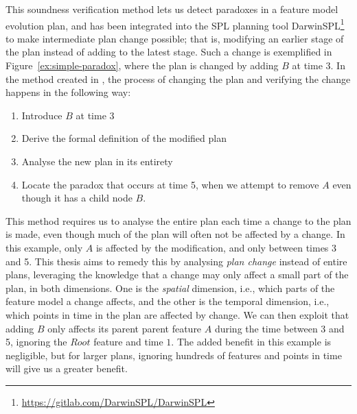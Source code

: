 This soundness verification method lets us detect paradoxes in a feature model evolution plan, and has been integrated into the SPL planning tool DarwinSPL\footnote{\url{https://gitlab.com/DarwinSPL/DarwinSPL}} to make intermediate plan change possible; that is, modifying an earlier stage of the plan instead of adding to the latest stage. Such a change is exemplified in Figure~\ref{ex:simple-paradox}, where the plan is changed by adding $B$ at time $3$. In the method created in \cite{art:consistency-preserving-evolution-planning}, the process of changing the plan and verifying the change happens in the following way:
\begin{enumerate}[1)]
   \item Introduce $B$ at time $3$
   \item Derive the formal definition of the modified plan
   \item Analyse the new plan in its entirety
   \item Locate the paradox that occurs at time 5, when we attempt to remove $A$ even though it has a child node $B$.
\end{enumerate}
This method requires us to analyse the entire plan each time a change to the plan is made, even though much of the plan will often not be affected by a change. In this example, only $A$ is affected by the modification, and only between times 3 and 5. This thesis aims to remedy this by analysing \emph{plan change} instead of entire plans, leveraging the knowledge that a change may only affect a small part of the plan, in both dimensions. One is the \emph{spatial} dimension, i.e., which parts of the feature model a change affects, and the other is the temporal dimension, i.e., which points in time in the plan are affected by change.  We can then exploit that adding $B$ only affects its parent parent feature $A$ during the time between 3 and 5, ignoring the $Root$ feature and time $1$. The added benefit in this example is negligible, but for larger plans, ignoring hundreds of features and points in time will give us a greater benefit.


